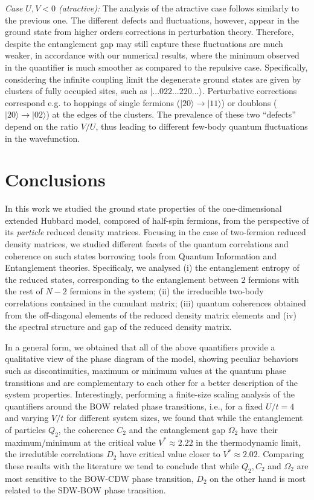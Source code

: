 \documentclass[prb,reprint,showpacs,twocolumn,superscriptaddress]{revtex4-2}
\begin{document}
\textit{Case $U,V<0$ (atractive):} The analysis of the atractive case follows similarly to the previous one. The different defects and fluctuations, however, appear in the ground state from higher orders corrections in perturbation theory. Therefore, despite the entanglement gap may still capture these fluctuations are much weaker, in accordance with our numerical results, where the minimum observed in the quantifier is much smoother as compared to the repulsive case. Specifically, considering the infinite coupling limit the degenerate ground states are given by clusters of fully occupied sites, such as $|...022...220...\rangle$. Perturbative corrections correspond e.g. to hoppings of single fermions ($|20\rangle \rightarrow |11\rangle$) or doublons ($|20\rangle  \rightarrow |02\rangle$) at the edges of the clusters. The prevalence of these two ``defects'' depend on the ratio $V/U$, thus leading to different few-body quantum fluctuations in the wavefunction.

\section{Conclusions}
\label{sec.conclusions}

In this work we studied the ground state properties of the one-dimensional extended Hubbard model, composed of half-spin fermions, from the perspective of its \textit{particle} reduced density matrices. Focusing in the case of two-fermion reduced density matrices, we 
studied different facets of the quantum correlations and coherence on such states borrowing tools from Quantum Information and Entanglement theories. Specificaly, we analysed (i) the entanglement entropy of the reduced states, corresponding to the entanglement between $2$ fermions with the rest of $N-2$ fermions in the system; (ii) the irreducible two-body correlations contained in the cumulant matrix;  (iii) quantum coherences obtained from the off-diagonal elements of the reduced density matrix elements and (iv) the spectral structure and gap of the reduced density matrix.

In a general form, we obtained that all of the above quantifiers provide a qualitative view of the phase diagram of the model, showing peculiar behaviors such as discontinuities, maximum or minimum
values at the quantum phase transitions and are complementary to each other for a better description of the system properties. 
Interestingly, performing a finite-size scaling analysis of the quantifiers around the BOW related phase transitions, i.e., for a fixed $U/t=4$ and varying $V/t$ for different system sizes, we found that while the entanglement of particles $Q_2$, the coherence $C_2$ and the entanglement gap $\Omega_2$ have their maximum/minimum at the critical value $V^* \approx 2.22$ in the thermodynamic limit, the irredutible correlations $D_2$  have critical value closer to  $V^* \approx 2.02$. Comparing these results with the literature we tend to conclude that while $Q_2, C_2$ and $\Omega_2$ are most sensitive to the BOW-CDW phase transition, $D_2$ on the other hand is most related to the SDW-BOW phase transition.
\end{document}
